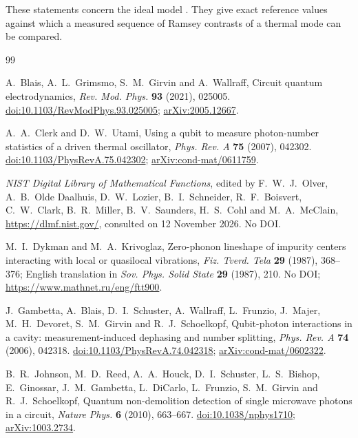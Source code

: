 \documentclass[11pt,reqno]{amsart}
\makeatletter
\let\CG@origeqref\eqref
\newcommand{\CG@gettip}[1]{\@ifundefined{CGTip@#1}{Reference: #1}{\csname CGTip@#1\endcsname}}
\DeclareRobustCommand{\CGeqref}[1]{\pdftooltip{\CG@origeqref{#1}}{\CG@gettip{#1}}}
\numberwithin{equation}{section}
\theoremstyle{plain}
\theoremstyle{definition}
\theoremstyle{remark}
\makeatother
\begin{document}
These statements concern the ideal model \CGeqref{eq:H}. They give exact reference values against which a measured sequence of Ramsey contrasts of a thermal mode can be compared.

\begin{thebibliography}{99}

A.~Blais, A.~L.~Grimsmo, S.~M.~Girvin and A.~Wallraff, Circuit quantum electrodynamics, \emph{Rev. Mod. Phys.} \textbf{93} (2021), 025005.
\href{https://doi.org/10.1103/RevModPhys.93.025005}{doi:10.1103/RevModPhys.93.025005};
\href{https://arxiv.org/abs/2005.12667}{arXiv:2005.12667}.

A.~A.~Clerk and D.~W.~Utami, Using a qubit to measure photon-number statistics of a driven thermal oscillator, \emph{Phys. Rev. A} \textbf{75} (2007), 042302.
\href{https://doi.org/10.1103/PhysRevA.75.042302}{doi:10.1103/PhysRevA.75.042302};
\href{https://arxiv.org/abs/cond-mat/0611759}{arXiv:cond-mat/0611759}.

\emph{NIST Digital Library of Mathematical Functions}, edited by F.~W.~J.~Olver, A.~B.~Olde Daalhuis, D.~W.~Lozier, B.~I.~Schneider, R.~F.~Boisvert, C.~W.~Clark, B.~R.~Miller, B.~V.~Saunders, H.~S.~Cohl and M.~A.~McClain,
\href{https://dlmf.nist.gov/}{https://dlmf.nist.gov/}, consulted on 12 November 2026. No DOI.

M.~I.~Dykman and M.~A.~Krivoglaz, Zero-phonon lineshape of impurity centers interacting with local or quasilocal vibrations, \emph{Fiz. Tverd. Tela} \textbf{29} (1987), 368--376; English translation in \emph{Sov. Phys. Solid State} \textbf{29} (1987), 210. No DOI;
\href{https://www.mathnet.ru/eng/ftt900}{https://www.mathnet.ru/eng/ftt900}.

J.~Gambetta, A.~Blais, D.~I.~Schuster, A.~Wallraff, L.~Frunzio, J.~Majer, M.~H.~Devoret, S.~M.~Girvin and R.~J.~Schoelkopf, Qubit-photon interactions in a cavity: measurement-induced dephasing and number splitting, \emph{Phys. Rev. A} \textbf{74} (2006), 042318.
\href{https://doi.org/10.1103/PhysRevA.74.042318}{doi:10.1103/PhysRevA.74.042318};
\href{https://arxiv.org/abs/cond-mat/0602322}{arXiv:cond-mat/0602322}.

B.~R.~Johnson, M.~D.~Reed, A.~A.~Houck, D.~I.~Schuster, L.~S.~Bishop, E.~Ginossar, J.~M.~Gambetta, L.~DiCarlo, L.~Frunzio, S.~M.~Girvin and R.~J.~Schoelkopf, Quantum non-demolition detection of single microwave photons in a circuit, \emph{Nature Phys.} \textbf{6} (2010), 663--667.
\href{https://doi.org/10.1038/nphys1710}{doi:10.1038/nphys1710};
\href{https://arxiv.org/abs/1003.2734}{arXiv:1003.2734}.


\end{thebibliography}
\end{document}
